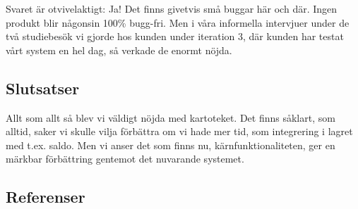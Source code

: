 Svaret är otvivelaktigt: Ja! Det finns
givetvis små buggar här och där. Ingen
produkt blir någonsin 100\% bugg-fri.
Men i våra informella intervjuer under de två studiebesök vi gjorde hos kunden
under iteration 3, där kunden har testat
vårt system en hel dag, så verkade de enormt nöjda.




\subsection{Slutsatser}
Allt som allt så blev vi väldigt nöjda med kartoteket.
Det finns såklart, som alltid, saker vi skulle vilja förbättra om vi
hade mer tid, som integrering i lagret med t.ex. saldo.
Men vi anser det som finns nu, kärnfunktionaliteten,
ger en märkbar förbättring gentemot det nuvarande systemet.




\subsection{Referenser}
\vspace{-9mm}
\begin{thebibliography}{9}

\end{thebibliography}
